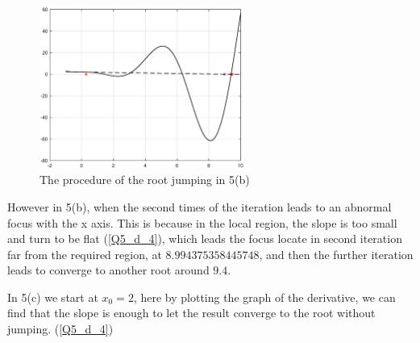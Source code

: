 \begin{solution}
\begin{enumerate}[label=(\alph*)]
\begin{figure}[htb] %
\centering %
\includegraphics[width=0.6\textwidth]{fig/Q5_d_3.eps} %
\caption{The procedure of the root jumping in 5(b)} %
\label{5_d_3} %
\end{figure}







However in 5(b), when the second times of the iteration leads to an abnormal focus with the x axis. This is because in the local region, the slope is too small and turn to be flat (\ref{Q5_d_4}), which leads the focus locate in second iteration far from the required region, at $8.994375358445748$, and then the further iteration leads to converge to another root around $9.4$.


In 5(c) we start at $x_0=2$, here by plotting the graph of the derivative, we can find that the slope is enough to let the result converge to the root without jumping. (\ref{Q5_d_4})


\begin{figure}
\centering
{}
\quad
{}
\end{figure}
\end{enumerate}
\end{solution}
